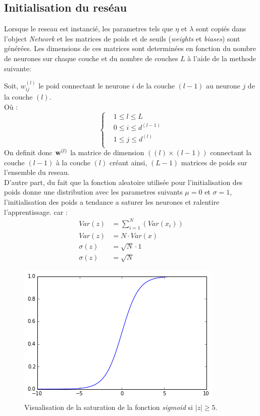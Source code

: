 \documentclass[11pt]{article}
\begin{document}
\subsection{Initialisation du res\'eau}
Lorsque le reseau est instanci\'e, les parametres tels que $\eta$ et $\lambda$
sont copi\'es dans l'object
\emph{Network} et les matrices de poids et de seuils (\emph{weights} et
\emph{biases}) sont g\'en\'er\'ees. Les dimensions de ces matrices sont
determin\'ees en fonction du nombre de neurones sur chaque couche et du nombre
de couches $L$ \`a l'aide de la methode suivante:

Soit, $w_{ij}^{(l)}$ le poid connectant le neurone $i$ de la couche $(l-1)$ au
neurone $j$ de la couche $(l)$. \\
O\`u :
\begin{equation}
	\left \{
	\begin{aligned}
		&1 \le l \le L \\
		&0 \le i \le d^{(l-1)} \\
		&1 \le j \le d^{(l)} \\
	\end{aligned}
	\right .
\end{equation}
On definit donc ${\bf w}^{(l)}$ la matrice de dimension $((l) \times (l-1))$
connectant la couche $(l-1)$ \`a la couche $(l)$ cr\'eant ainsi, $(L-1)$ matrices
de poids sur l'ensemble du reseau. \\

D'autre part, du fait que la fonction aleatoire utilis\'ee pour l'initialisation
des poids donne une distribution avec les parametres suivants $\mu=0$ et $\sigma=1$,
l'initialisation des poids a tendance a saturer les neurones et ralentire l'apprentissage.
car :
\begin{equation}
	\begin{aligned}
		Var(z) &= \sum_{i=1}^N(Var(x_i)) \\
		Var(z) &= N \cdot Var(x) \\
		\sigma(z) &= \sqrt{N} \cdot 1 \\
		\sigma(z) &= \sqrt{N}
	\end{aligned}
\end{equation}




\begin{figure}[htp]
	\centering
	\includegraphics[scale=.5]{img/sigmoid_sat.png}
	\caption{Visualisation de la saturation de la fonction \emph{sigmoid} si
	$|z| \ge 5$.}
\end{figure} \\
\end{document}
